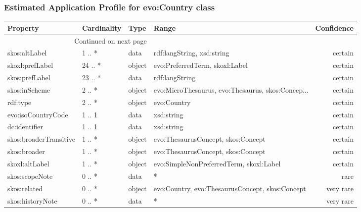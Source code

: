 \documentclass[10pt,a4paper,titlepage,final]{article}
\begin{document}
\subsubsection{Estimated Application Profile for evo:Country class}
\begin{tabularx}{\textwidth}{lllXr}
\toprule
               Property & Cardinality &    Type &                                              Range & Confidence \\
\midrule
\endhead
\midrule
\multicolumn{3}{r}{{Continued on next page}} \\
\midrule
\endfoot

\bottomrule
\endlastfoot
          skos:altLabel &      1 .. * &    data &                         rdf:langString, xsd:string &    certain \\
        skoxl:prefLabel &     24 .. * &  object &                     evo:PreferredTerm, skoxl:Label &    certain \\
         skos:prefLabel &     23 .. * &    data &                                     rdf:langString &    certain \\
          skos:inScheme &      2 .. * &  object &  evo:MicroThesaurus, evo:Thesaurus, skos:Concep... &    certain \\
               rdf:type &      2 .. * &  object &                                        evo:Country &    certain \\
     evo:isoCountryCode &      1 .. 1 &    data &                                         xsd:string &    certain \\
          dc:identifier &      1 .. 1 &    data &                                         xsd:string &    certain \\
 skos:broaderTransitive &      1 .. * &  object &                 evo:ThesaurusConcept, skos:Concept &    certain \\
           skos:broader &      1 .. * &  object &                 evo:ThesaurusConcept, skos:Concept &    certain \\
         skoxl:altLabel &      1 .. * &  object &            evo:SimpleNonPreferredTerm, skoxl:Label &    certain \\
         skos:scopeNote &      0 .. * &    data &                                                  * &       rare \\
           skos:related &      0 .. * &  object &    evo:Country, evo:ThesaurusConcept, skos:Concept &  very rare \\
       skos:historyNote &      0 .. * &    data &                                                  * &  very rare \\

\end{tabularx}
\end{document}
